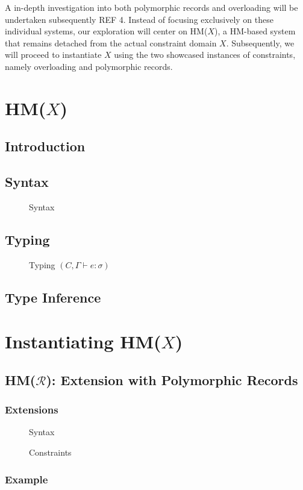 \documentclass[runningheads]{llncs}
\newcommand{\hmx}{HM($X$)}
\newcommand{\hmr}{HM($\mathcal{R}$)}
\begin{document}
A in-depth investigation into both polymorphic records and overloading will be
undertaken subsequently {{REF 4}}.
Instead of focusing exclusively on these individual systems, our exploration
will center on \hmx{}, a HM-based system that remains detached from
the actual constraint domain $X$.
Subsequently, we will proceed to instantiate $X$ using the two showcased
instances of constraints, namely overloading and polymorphic records.
\section{\hmx{}}
\subsection{Introduction}
\subsection{Syntax}
\begin{figure}[t]
  \centering
  \caption{Syntax}
\end{figure}
\subsection{Typing}
\begin{figure}[t]
  \centering
  \caption{Typing $(C, Γ ⊢ e : σ)$}
\end{figure}
\subsection{Type Inference}
\section{Instantiating \hmx{}}
\subsection{\hmr{}: Extension with Polymorphic Records}
\subsubsection{Extensions}
\begin{figure}[t]
  \centering
  \caption{Syntax}
\end{figure}
\begin{figure}[t]
  \centering
  \caption{Constraints}
\end{figure}
\subsubsection{Example}
\end{document}
